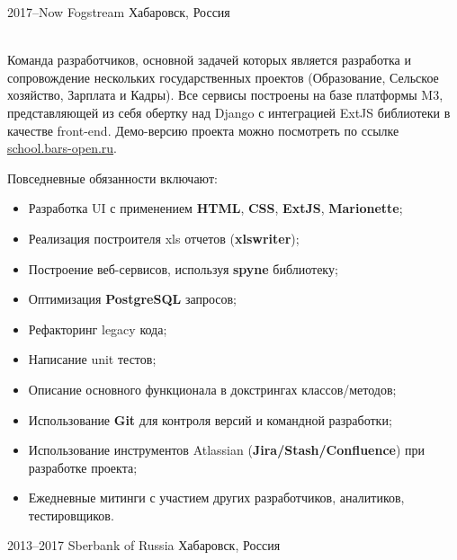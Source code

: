 \documentclass[]{cv-style}
\begin{document}
\begin{entrylist}
\entry
  {2017--Now}
  {Fogstream}
  {Хабаровск, Россия}
  {\\

  Команда разработчиков, основной задачей которых является разработка и сопровождение нескольких государственных проектов 
  (Образование, Сельское хозяйство, Зарплата и Кадры). Все сервисы построены на базе платформы M3, 
  представляющей из себя обертку над Django с интеграцией ExtJS библиотеки в качестве front-end. 
  Демо-версию проекта можно посмотреть по ссылке \href{http://school.bars-open.ru}{school.bars-open.ru}.

  Повседневные обязанности включают:
  \begin{itemize}
      \item Разработка UI с применением \textbf{HTML}, \textbf{CSS}, \textbf{ExtJS}, \textbf{Marionette};
      \item Реализация построителя xls отчетов (\textbf{xlswriter});
      \item Построение веб-сервисов, используя \textbf{spyne} библиотеку;
      \item Оптимизация \textbf{PostgreSQL} запросов;
      \item Рефакторинг legacy кода;
      \item Написание unit тестов;
      \item Описание основного функционала в докстрингах классов/методов;
      \item Использование \textbf{Git} для контроля версий и командной разработки;
      \item Использование инструментов Atlassian (\textbf{Jira/Stash/Confluence}) при разработке проекта;
      \item Ежедневные митинги с участием других разработчиков, аналитиков, тестировщиков.
  \end{itemize}}
\entry
  {2013--2017}
  {Sberbank of Russia}
  {Хабаровск, Россия}
  {\\

}
\end{entrylist}
\end{document}
